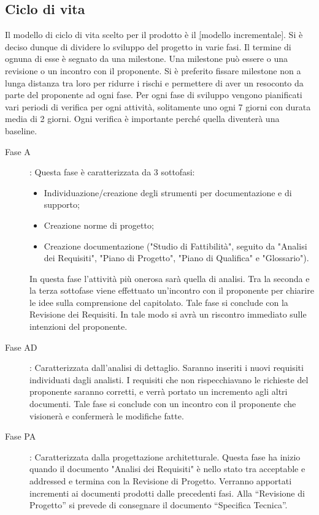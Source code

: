 	\subsection{Ciclo di vita}
		Il modello di ciclo di vita scelto per il prodotto è il \underline[modello incrementale].
		Si è deciso dunque di dividere lo sviluppo del progetto in varie fasi. Il termine di ognuna di esse è segnato da una milestone. Una milestone può essere o una revisione o un incontro con il proponente. Si è preferito fissare milestone non a lunga distanza tra loro per ridurre i rischi e permettere di aver un resoconto da parte del proponente ad ogni fase. Per ogni fase di sviluppo vengono pianificati vari periodi di verifica per ogni attività, solitamente uno ogni 7 giorni con durata media di 2 giorni. Ogni verifica è importante perché quella diventerà una baseline.
		\begin{description}
			\item[Fase A]: Questa fase è caratterizzata da 3 sottofasi:
				\begin{itemize}
					\item Individuazione/creazione degli strumenti per documentazione e di supporto;
					\item Creazione norme di progetto;
					\item Creazione documentazione ("Studio di Fattibilità", seguito da "Analisi dei Requisiti", "Piano di Progetto", "Piano di Qualifica" e "Glossario").
				\end{itemize}
				In questa fase l'attività più onerosa sarà quella di analisi.
				Tra la seconda e la terza sottofase viene effettuato un'incontro con il proponente per chiarire le idee sulla comprensione del capitolato.
				Tale fase si conclude con la Revisione dei Requisiti. In tale modo si avrà un riscontro immediato sulle intenzioni del proponente.
			\item[Fase AD]: Caratterizzata dall’analisi di dettaglio. Saranno inseriti i nuovi requisiti individuati dagli analisti. I requisiti che non rispecchiavano le richieste del proponente saranno corretti, e verrà portato un incremento agli altri documenti.
			Tale fase si conclude con un incontro con il proponente che visionerà e confermerà le modifiche fatte.
			\item[Fase PA]: Caratterizzata dalla progettazione architetturale. Questa fase ha inizio quando il documento "Analisi dei Requisiti" è nello stato tra acceptable e addressed e termina con la Revisione di Progetto. Verranno apportati incrementi ai documenti prodotti dalle precedenti fasi. Alla “Revisione di Progetto” si prevede di consegnare il documento “Specifica Tecnica”.

\end{description}
